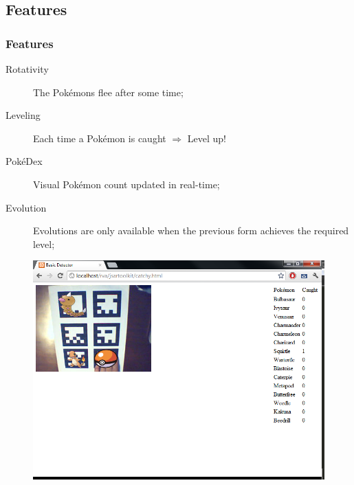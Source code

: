 \documentclass{beamer}
\begin{document}
\subsection{Features}
\begin{frame}
	\frametitle{Features}
	\begin{description}
		\item[Rotativity]{The Pokémons flee after some time;}
		\vfill
		\item[Leveling]{Each time a Pokémon is caught $\Rightarrow$ Level up!}
		\vfill
		\item[PokéDex]{Visual Pokémon count updated in real-time;}
		\vfill
		\item[Evolution]{Evolutions are only available when the previous form achieves the required level;}
	\end{description}
\end{frame}

\begin{frame}[plain]
	\begin{figure}
		\begin{center}
			\includegraphics[width=\textwidth]{slides/images/catchy.png}
		\end{center}
	\end{figure}
\end{frame}
\end{document}
